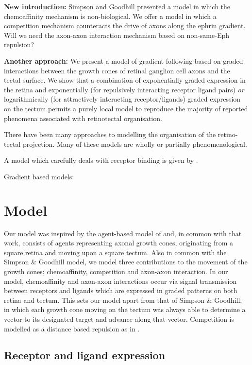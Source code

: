 \documentclass[11pt, a4paper]{article}
\begin{document}
\textbf{New introduction:} Simpson and Goodhill presented a model in which the
chemoaffinity mechanism is non-biological. We offer a model in which a
competition mechanism counteracts the drive of axons along the ephrin
gradient. Will we need the axon-axon interaction mechanism based on
non-same-Eph repulsion?

\textbf{Another approach:} We present a model of gradient-following based on graded
interactions between the growth cones of retinal ganglion cell axons and the
tectal surface. We show that a combination of exponentially graded expression
in the retina \citep{reber_relative_2004} and exponentially (for repulsively
interacting receptor ligand pairs) \emph{or} logarithmically (for attractively
interacting receptor/ligands) graded expression on the tectum permits a purely
local model to reproduce the majority of reported phenomena associated with
retinotectal organisation.

There have been many approaches to modelling the organisation of the
retino-tectal projection. Many of these models are wholly or partially
phenomenological.

A model which carefully deals with receptor
binding is given by \citet{naoki_revisiting_2017} \citep[see also][]{mortimer_bayesian_2009}.

Gradient based models: \citet{nakomoto_topographically_1996}

\section{Model}

Our model was inspired by the agent-based model of \cite{simpson_simple_2011}
and, in common with that work, consists of agents representing axonal growth
cones, originating from a square retina and moving upon a square tectum. Also
in common with the Simpson \& Goodhill model, we model three contributions to
the movement of the growth cones; chemoaffinity, competition and axon-axon
interaction. In our model, chemoaffinity and axon-axon interactions occur via
signal transmission between receptors and ligands which are expressed in
graded patterns on both retina and tectum. This sets our model apart from that
of Simpson \& Goodhill, in which each growth cone moving on the tectum was
always able to determine a vector to its designated target and advance along
that vector. Competition is modelled as a distance based repulsion as
in \cite{simpson_simple_2011}.

\subsection{Receptor and ligand expression}
\end{document}
